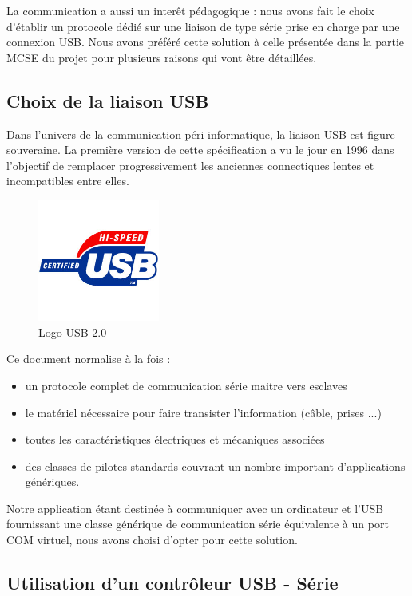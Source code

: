 \documentclass[11pt, french]{article} %
\begin{document}
La communication a aussi un interêt pédagogique : nous avons fait le choix d'établir un protocole dédié sur une liaison de type série prise en charge par une connexion USB. Nous avons préféré cette solution à celle présentée dans la partie MCSE du projet pour plusieurs raisons qui vont être détaillées.

\subsection{Choix de la liaison USB}
	
Dans l'univers de la communication péri-informatique, la liaison USB est figure souveraine. La première version de cette spécification a vu le jour en 1996 dans l'objectif de remplacer progressivement les anciennes connectiques lentes et incompatibles entre elles.

\begin{figure}
	\includegraphics[width = 4cm]{SolutionNumerique/usb-logo.jpg}
	\caption{Logo USB 2.0}
\end{figure}

\medskip
Ce document normalise à la fois : 
\medskip
\begin{itemize}
	\item un protocole complet de communication série maitre vers esclaves
	\item le matériel nécessaire pour faire transister l'information (câble, prises ...)
	\item toutes les caractéristiques électriques et mécaniques associées
	\item des classes de pilotes standards couvrant un nombre important d'applications génériques.
\end{itemize}

\medskip
Notre application étant destinée à communiquer avec un ordinateur et l'USB fournissant une classe générique de communication série équivalente à un port COM virtuel, nous avons choisi d'opter pour cette solution.

\subsection{Utilisation d'un contrôleur USB - Série}
\end{document}
